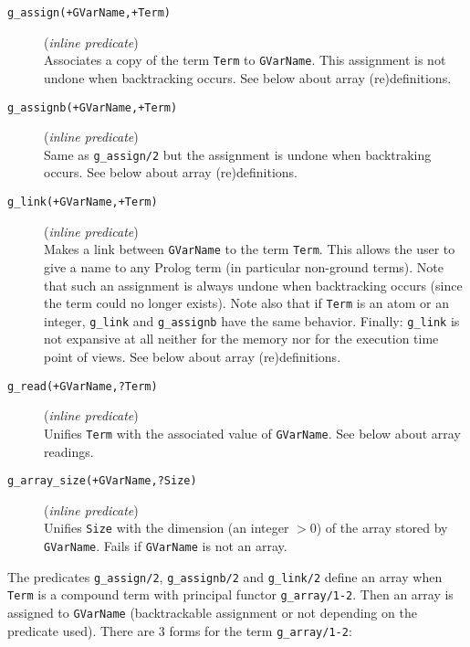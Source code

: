 \begin{description}

\item [{\tt g\_assign(+GVarName,+Term)}] ({\em inline predicate})~\\
	Associates a copy of the term {\tt Term} to {\tt GVarName}.
	This assignment is not undone when backtracking occurs.
	See below about array (re)definitions.

\item [{\tt g\_assignb(+GVarName,+Term)}] ({\em inline predicate})~\\
	Same as {\tt g\_assign/2} but the assignment is undone when
	backtraking occurs.
	See below about array (re)definitions.

\item [{\tt g\_link(+GVarName,+Term)}] ({\em inline predicate})~\\
	Makes a link between {\tt GVarName} to the term {\tt Term}.
	This allows the user to give a name to any Prolog term (in
	particular non-ground terms).
	Note that such an assignment is always undone when backtracking
	occurs (since the term could no longer exists).
	Note also that if {\tt Term} is an atom or an integer, {\tt g\_link}
	and {\tt g\_assignb} have the same behavior.
	Finally: {\tt g\_link} is not expansive at all neither for the
	memory nor for the execution time point of views.
	See below about array (re)definitions.

\item [{\tt g\_read(+GVarName,?Term)}] ({\em inline predicate})~\\
	Unifies {\tt Term} with the associated value of {\tt GVarName}.
	See below about array readings.

\item [{\tt g\_array\_size(+GVarName,?Size)}] ({\em inline predicate})~\\
	Unifies {\tt Size} with the dimension (an integer $>0$) of the
	array stored by {\tt GVarName}. Fails if {\tt GVarName} is not
	an array.

\end{description}


The predicates {\tt g\_assign/2}, {\tt g\_assignb/2} and {\tt g\_link/2}
define an array when {\tt Term} is a compound term with principal
functor {\tt g\_array/1-2}. Then an array is assigned to {\tt GVarName}
(backtrackable assignment or not depending on the predicate used).
There are 3 forms for the term {\tt g\_array/1-2}:

